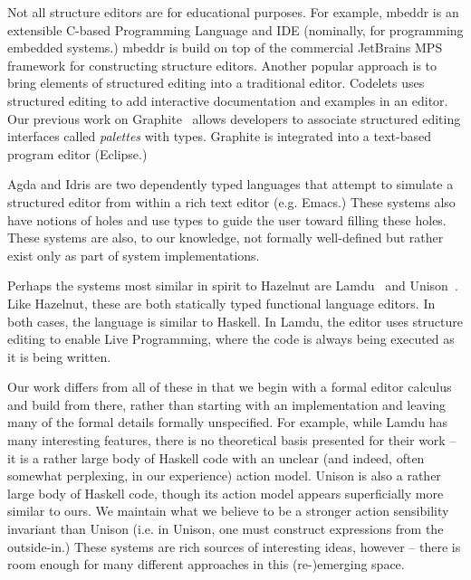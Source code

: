 \documentclass[preprint,9pt]{sigplanconf}
\begin{document}
Not all structure editors are for educational purposes. For example,
mbeddr \cite{voelter_mbeddr:_2012} is an extensible C-based Programming Language and IDE (nominally, for programming embedded systems.)
mbeddr is build on top of the commercial JetBrains MPS framework for constructing structure editors.
Another popular approach is to bring elements of structured editing into a traditional editor.
Codelets \cite{oney_codelets:_2012} uses structured editing to add interactive documentation and examples in an editor.
Our previous work on Graphite~\cite{Omar:2012:ACC:2337223.2337324} allows developers to associate structured editing interfaces called  \emph{palettes} with types. Graphite is integrated into a text-based program editor (Eclipse.)

Agda and Idris are two dependently typed languages that attempt to simulate a structured editor from within a rich text editor (e.g. Emacs.) These systems also have notions of holes and use types to guide the user toward filling these holes. These  systems are also, to our knowledge, not formally well-defined but rather exist only as part of system implementations.

Perhaps the systems most similar in spirit to Hazelnut are Lamdu~\cite{lamdu} and Unison~\cite{unison}. Like Hazelnut, these are both statically typed functional language editors. In both cases, the language is similar to Haskell. In Lamdu, the editor uses structure editing to enable Live Programming, where the code is always being executed as it is being written.

Our work differs from all of these in that we begin with a formal editor calculus and build from there, rather than starting with an implementation and leaving many of the formal details formally unspecified. For example, while Lamdu has many interesting features, there is no theoretical basis presented for their work -- it is a rather large body of Haskell code with an unclear (and indeed, often somewhat perplexing, in our experience) action model. Unison is also a rather large body of Haskell code, though its action model appears superficially more similar to ours. We maintain what we believe to be a stronger action sensibility invariant than Unison (i.e. in Unison, one must construct expressions from the outside-in.) These systems are rich sources of interesting ideas, however -- there is room enough for many different approaches in this (re-)emerging space.

\end{document}
